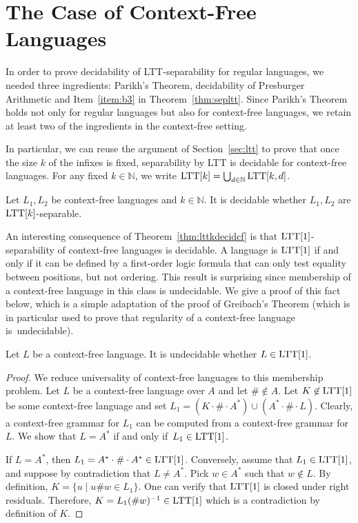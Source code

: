 \documentclass{LMCS}
\newcommand\nat{\ensuremath{\mathbb{N}}\xspace}
\newcommand{\ltt}{\textup{LTT}\xspace}
\theoremstyle{plain}
\begin{document}
\section{The Case of Context-Free Languages}
\label{sec:cf}
\makeatletter{}In order to prove decidability of \ltt-separability for regular
languages, we needed three ingredients: Parikh's Theorem,
decidability of Presburger Arithmetic and Item~\eqref{item:b3} in
Theorem~\ref{thm:sepltt}. Since Parikh's Theorem holds not
only for regular languages but also for context-free languages, we
retain at least two of the ingredients in the context-free setting.

In particular, we can reuse the argument of Section~\ref{sec:ltt} to
prove that once the size $k$ of the infixes is fixed, separability by
\ltt is decidable for context-free languages. For any fixed $k \in
\nat$, we write $\ltt[k] = \bigcup_{d \in \nat} \ltt[k,d]$.

\begin{thm} \label{thm:lttkdecidcf}
  Let $L_1,L_2$ be context-free languages and $k \in \nat$. It is
  decidable whether $L_1,L_2$ are $\ltt[k]$-separable.
\end{thm}

An interesting consequence of Theorem~\ref{thm:lttkdecidcf} is that
$\ltt[1]$-separability of context-free languages is decidable. A
language is $\ltt[1]$ if and only if it can be defined by a
first-order logic formula that can only test equality between
positions, but not ordering. This result is surprising since
membership of a context-free language in this class is undecidable. We
give a proof of this fact below, which is a simple
adaptation of the proof of Greibach's Theorem (which is in particular
used to prove that regularity of a context-free language is~undecidable).

\begin{thm} \label{thm:lttkdecidcf2} Let $L$ be a context-free
  language. It is undecidable whether $L \in \ltt[1]$.
\end{thm}

\begin{proof}
  We reduce universality of context-free languages to this membership
  problem. Let $L$ be a context-free language over $A$ and let $\#
  \not\in A$. Let $K \not\in \ltt[1]$ be some context-free language
  and set $L_1 = (K \cdot \# \cdot A^{*}) \cup (A^{*} \cdot \# \cdot
  L)$. Clearly, a context-free grammar for $L_1$ can be computed from
  a context-free grammar for $L$. We show that $L=A^{*}$ if and only
  if~$L_1 \in \ltt[1]$.

  If $L=A^{*}$, then $L_1= A^{*} \cdot \# \cdot A^{*} \in
  \ltt[1]$. Conversely, assume that $L_1 \in \ltt[1]$, and suppose by
  contradiction that $L \neq A^{*}$. Pick $w \in A^{*}$ such that $w
  \not\in L$. By definition, $K=\{u \mid u \# w \in L_1\}$. One can
  verify that $\ltt[1]$ is closed under right residuals. Therefore,
  $K=L_1(\#w)^{-1} \in \ltt[1]$ which is a contradiction by definition
  of $K$.
\end{proof}
\end{document}
